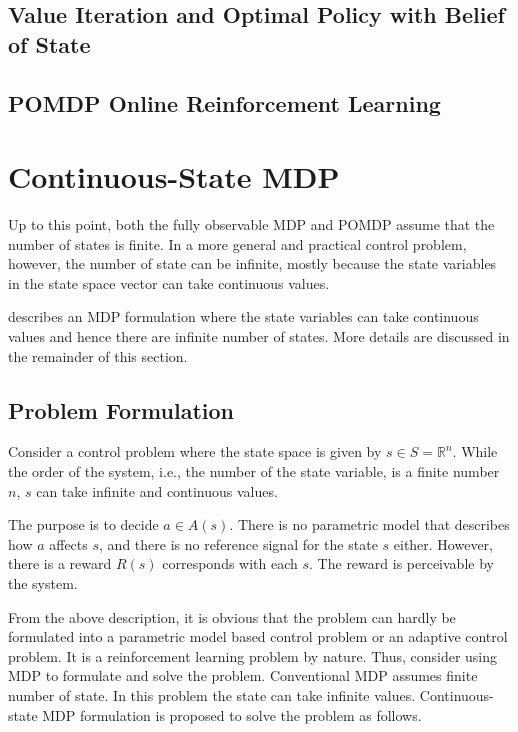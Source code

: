 \subsection{Value Iteration and Optimal Policy with Belief of State}

\subsection{POMDP Online Reinforcement Learning}

\section{Continuous-State MDP}

Up to this point, both the fully observable MDP and POMDP assume that the number of states is finite. In a more general and practical control problem, however, the number of state can be infinite, mostly because the state variables in the state space vector can take continuous values.

 describes an MDP formulation where the state variables can take continuous values and hence there are infinite number of states. More details are discussed in the remainder of this section.

\subsection{Problem Formulation}

Consider a control problem where the state space is given by $s\in S=\mathbb{R}^n$. While the order of the system, i.e., the number of the state variable, is a finite number $n$, $s$ can take infinite and continuous values.

The purpose is to decide $a \in A(s)$. There is no parametric model that describes how $a$ affects $s$, and there is no reference signal for the state $s$ either. However, there is a reward $R(s)$ corresponds with each $s$. The reward is perceivable by the system.

From the above description, it is obvious that the problem can hardly be formulated into a parametric model based control problem or an adaptive control problem. It is a reinforcement learning problem by nature. Thus, consider using MDP to formulate and solve the problem. Conventional MDP assumes finite number of state. In this problem the state can take infinite values. Continuous-state MDP formulation is proposed to solve the problem as follows.

